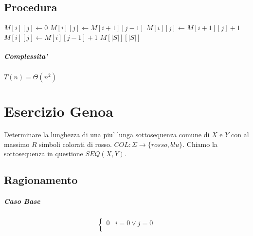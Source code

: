 \newpage

\section{Procedura}

\begin{algorithm}
    \begin{algorithmic}
                        \State $M[i][j] \gets 0$
                        \State $M[i][j] \gets M[i+1][j-1]$
                            \State $M[i][j] \gets M[i+1][j] + 1$
                        \Else
                            \State $M[i][j] \gets M[i][j-1] + 1$
                        \EndIf
                    \EndIf
                \EndFor
            \EndFor
            \State \Return $M[|S|][|S|]$
        \EndProcedure
    \end{algorithmic}
\end{algorithm}

\paragraph{Complessita'}

$T(n) = \Theta(n^2)$

\chapter{Esercizio Genoa}

Determinare la lunghezza di una piu' lunga sottosequenza comune di $X$ e $Y$ con al massimo $R$ simboli colorati di rosso. $COL : \Sigma \rightarrow \{ rosso, blu \}$.
Chiamo la sottosequenza in questione $SEQ(X, Y)$.

\section{Ragionamento}

\paragraph{Caso Base}

\[
    \begin{cases}
        \text{$0$} & \text{$i = 0 \lor j = 0$} \\
    \end{cases}
\]

